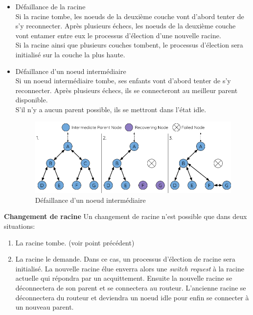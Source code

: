 \documentclass[a4paper, 12pt]{report}
\begin{document}
            \begin{itemize}
                \item Défaillance de la racine\\
                    Si la racine tombe, les noeuds de la deuxième couche vont d'abord tenter de s'y reconnecter.
                    Après plusieurs échecs, les noeuds de la deuxième couche vont entamer entre eux le processus d'élection d'une nouvelle racine.\\
                    Si la racine ainsi que plusieurs couches tombent, le processus d'élection sera initialisé sur la couche la plus haute.


                \item Défaillance d'un noeud intermédiaire\\
                    Si un noeud intermédiaire tombe, ses enfants vont d'abord tenter de s'y reconnecter.
                    Après plusieurs échecs, ils se connecteront au meilleur parent disponible.\\
                    S'il n'y a aucun parent possible, ils se mettront dans l'état idle.
                    \begin{figure}[H]
                        \centering
                        \includegraphics[scale=0.5]{images/mesh-parent-node-failure.png}
                        \caption{Défaillance d'un noeud intermédiaire\cite{esp-mesh_w}}
                    \end{figure}
            \end{itemize}
            \vspace{0.5cm}
            \textbf{Changement de racine}\newline
                Un changement de racine n'est possible que dans deux situations:
                \begin{enumerate}
                    \item La racine tombe. (voir point précédent)
                    \item La racine le demande.
                        Dans ce cas, un processus d'élection de racine sera initialisé. La nouvelle racine élue
                        enverra alors une \textit{switch request} à la racine actuelle qui répondra par un acquittement.
                        Ensuite la nouvelle racine se déconnectera de son parent et se connectera au routeur.
                        L'ancienne racine se déconnectera du routeur et deviendra un noeud idle pour enfin se connecter à un nouveau parent.
                \end{enumerate}
\end{document}
